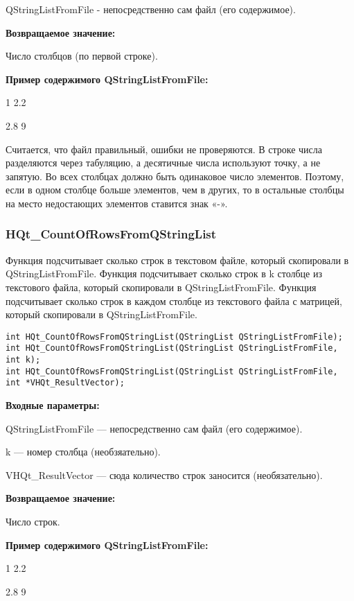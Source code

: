 \documentclass[a4paper,12pt]{article}
\begin{document}
QStringListFromFile - непосредственно сам файл (его содержимое).

\textbf{Возвращаемое значение:}

Число столбцов (по первой строке).

\textbf{Пример содержимого QStringListFromFile:}

1	2.2

2.8	9

Считается, что файл правильный, ошибки не проверяются. В строке числа разделяются через табуляцию, а десятичные числа используют точку, а не запятую. Во всех столбцах должно быть одинаковое число элементов. Поэтому, если в одном столбце больше элементов, чем в других, то в остальные столбцы на место недостающих элементов ставится знак «-».


\subsubsection{HQt\_CountOfRowsFromQStringList}\label{HQt_CountOfRowsFromQStringList}

Функция подсчитывает сколько строк в текстовом файле, который скопировали в QStringListFromFile. Функция подсчитывает сколько строк в k столбце из текстового файла, который скопировали в QStringListFromFile. Функция подсчитывает сколько строк в каждом столбце из текстового файла с матрицей, который скопировали в QStringListFromFile.


\begin{lstlisting}[label=code_syntax_HQt_CountOfRowsFromQStringList,caption=Синтаксис]
int HQt_CountOfRowsFromQStringList(QStringList QStringListFromFile);
int HQt_CountOfRowsFromQStringList(QStringList QStringListFromFile, int k);
int HQt_CountOfRowsFromQStringList(QStringList QStringListFromFile, int *VHQt_ResultVector);
\end{lstlisting}

\textbf{Входные параметры:}

QStringListFromFile --- непосредственно сам файл (его содержимое).

k --- номер столбца (необзяательно).

 VHQt\_ResultVector --- сюда количество строк заносится (необязательно).

\textbf{Возвращаемое значение:}

Число строк.

\textbf{Пример содержимого QStringListFromFile:}

1	2.2

2.8	9
\end{document}
